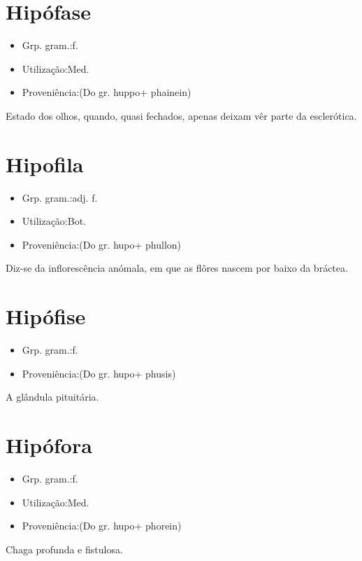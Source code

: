 \documentclass{article}
\begin{document}
\section{Hipófase}
\begin{itemize}
\item {Grp. gram.:f.}
\end{itemize}
\begin{itemize}
\item {Utilização:Med.}
\end{itemize}
\begin{itemize}
\item {Proveniência:(Do gr. \textunderscore huppo\textunderscore  + \textunderscore phainein\textunderscore )}
\end{itemize}
Estado dos olhos, quando, quasi fechados, apenas deixam vêr parte da esclerótica.
\section{Hipofila}
\begin{itemize}
\item {Grp. gram.:adj. f.}
\end{itemize}
\begin{itemize}
\item {Utilização:Bot.}
\end{itemize}
\begin{itemize}
\item {Proveniência:(Do gr. \textunderscore hupo\textunderscore  + \textunderscore phullon\textunderscore )}
\end{itemize}
Diz-se da inflorescência anómala, em que as flôres nascem por baixo da bráctea.
\section{Hipófise}
\begin{itemize}
\item {Grp. gram.:f.}
\end{itemize}
\begin{itemize}
\item {Proveniência:(Do gr. \textunderscore hupo\textunderscore  + \textunderscore phusis\textunderscore )}
\end{itemize}
A glândula pituitária.
\section{Hipófora}
\begin{itemize}
\item {Grp. gram.:f.}
\end{itemize}
\begin{itemize}
\item {Utilização:Med.}
\end{itemize}
\begin{itemize}
\item {Proveniência:(Do gr. \textunderscore hupo\textunderscore  + \textunderscore phorein\textunderscore )}
\end{itemize}
Chaga profunda e fistulosa.
\end{document}
